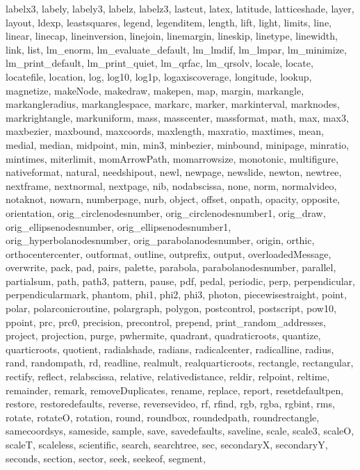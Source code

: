 {{  labelx3, labely, labely3, labelz, labelz3, lastcut, latex, latitude,
  latticeshade, layer, layout, ldexp, leastsquares, legend, legenditem,
  length, lift, light, limits, line, linear, linecap, lineinversion,
  linejoin, linemargin, lineskip, linetype, linewidth, link, list, lm_enorm,
  lm_evaluate_default, lm_lmdif, lm_lmpar, lm_minimize, lm_print_default,
  lm_print_quiet, lm_qrfac, lm_qrsolv, locale, locate, locatefile, location,
  log, log10, log1p, logaxiscoverage, longitude, lookup, magnetize, makeNode,
  makedraw, makepen, map, margin, markangle, markangleradius, markanglespace,
  markarc, marker, markinterval, marknodes, markrightangle, markuniform,
  mass, masscenter, massformat, math, max, max3, maxbezier, maxbound,
  maxcoords, maxlength, maxratio, maxtimes, mean, medial, median, midpoint,
  min, min3, minbezier, minbound, minipage, minratio, mintimes, miterlimit,
  momArrowPath, momarrowsize, monotonic, multifigure, nativeformat, natural,
  needshipout, newl, newpage, newslide, newton, newtree, nextframe,
  nextnormal, nextpage, nib, nodabscissa, none, norm, normalvideo, notaknot,
  nowarn, numberpage, nurb, object, offset, onpath, opacity, opposite,
  orientation, orig_circlenodesnumber, orig_circlenodesnumber1, orig_draw,
  orig_ellipsenodesnumber, orig_ellipsenodesnumber1,
  orig_hyperbolanodesnumber, orig_parabolanodesnumber, origin, orthic,
  orthocentercenter, outformat, outline, outprefix, output,
  overloadedMessage, overwrite, pack, pad, pairs, palette, parabola,
  parabolanodesnumber, parallel, partialsum, path, path3, pattern, pause,
  pdf, pedal, periodic, perp, perpendicular, perpendicularmark, phantom,
  phi1, phi2, phi3, photon, piecewisestraight, point, polar,
  polarconicroutine, polargraph, polygon, postcontrol, postscript, pow10,
  ppoint, prc, prc0, precision, precontrol, prepend, print_random_addresses,
  project, projection, purge, pwhermite, quadrant, quadraticroots, quantize,
  quarticroots, quotient, radialshade, radians, radicalcenter, radicalline,
  radius, rand, randompath, rd, readline, realmult, realquarticroots,
  rectangle, rectangular, rectify, reflect, relabscissa, relative,
  relativedistance, reldir, relpoint, reltime, remainder, remark,
  removeDuplicates, rename, replace, report, resetdefaultpen, restore,
  restoredefaults, reverse, reversevideo, rf, rfind, rgb, rgba, rgbint, rms,
  rotate, rotateO, rotation, round, roundbox, roundedpath, roundrectangle,
  samecoordsys, sameside, sample, save, savedefaults, saveline, scale,
  scale3, scaleO, scaleT, scaleless, scientific, search, searchtree, sec,
  secondaryX, secondaryY, seconds, section, sector, seek, seekeof, segment,
}}
